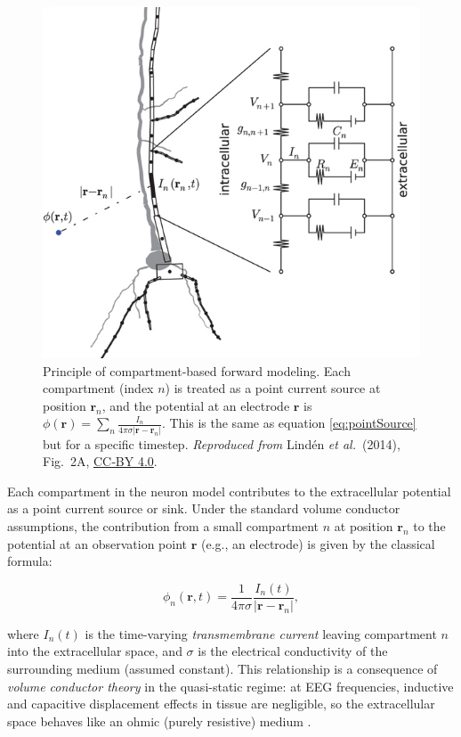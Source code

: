 \documentclass[final, a4paper,masters,en,listoffigures,listoftables,norwegiandates]{NMBU}
\begin{document}
\begin{figure}[ht]
  \centering
  \includegraphics[width=0.7\linewidth]{Figures/linden2014_fig2A.png}
  \caption{Principle of compartment‑based forward modeling.
           Each compartment (index $n$) is treated as a point current
           source at position $\mathbf r_n$, and the potential at an
           electrode $\mathbf r$ is 
           ${\displaystyle \phi(\mathbf r)=\sum_n
           \frac{I_n}{4\pi\sigma|\mathbf r-\mathbf r_n|}}$. This is the same as equation \ref{eq:pointSource} but for a specific timestep. 
           \textit{Reproduced from} Lindén \emph{et al.}\ (2014), Fig.~2A,
           \href{https://creativecommons.org/licenses/by/4.0/}{CC‑BY 4.0}.}
  \label{fig:compartment_forward_linden}
\end{figure}

Each compartment in the neuron model contributes to the extracellular potential as a point current source or sink. Under the standard volume conductor assumptions, the contribution from a small compartment $n$ at position $\mathbf{r}_n$ to the potential at an observation point $\mathbf{r}$ (e.g., an electrode) is given by the classical formula:

\begin{equation}
\phi_n(\mathbf{r}, t) = \frac{1}{4\pi\sigma} \frac{I_n(t)}{\lvert \mathbf{r} - \mathbf{r}_n \rvert},
\label{eq:pointSource}
\end{equation}

where $I_n(t)$ is the time-varying \textit{transmembrane current} leaving compartment $n$ into the extracellular space, and $\sigma$ is the electrical conductivity of the surrounding medium (assumed constant). This relationship is a consequence of \textit{volume conductor theory} in the quasi-static regime: at EEG frequencies, inductive and capacitive displacement effects in tissue are negligible, so the extracellular space behaves like an ohmic (purely resistive) medium \cite{Nunez2006}.
\end{document}
